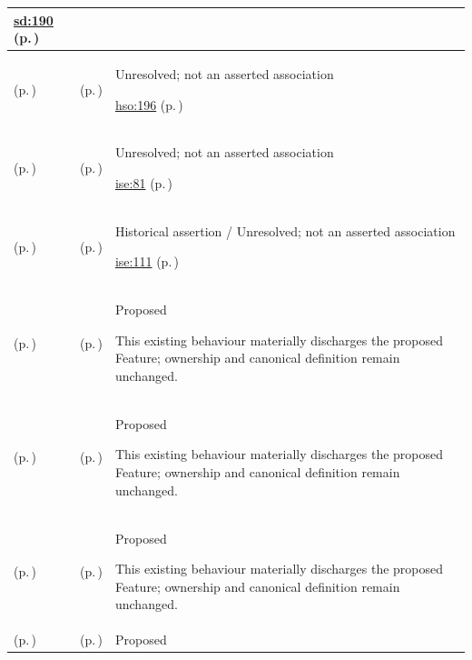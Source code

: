 \begin{longtable}{|>{\raggedright\arraybackslash}p{0.27\TableWidth}|>{\raggedright\arraybackslash}p{0.27\TableWidth}|>{\raggedright\arraybackslash}p{0.46\TableWidth}|}
 \hyperref[rad:sd:183]{sd:190} (p.\,\pageref{rad:sd:183})\\\hline
\nameref{function:track-operational-staff-presence} (p.\,\pageref{function:track-operational-staff-presence}) & \nameref{feature:feat-hso-16} (p.\,\pageref{feature:feat-hso-16}) & Unresolved; not an asserted association

 \hyperref[rad:hso:190]{hso:196} (p.\,\pageref{rad:hso:190})\\\hline
\nameref{function:retrieve-health-information} (p.\,\pageref{function:retrieve-health-information}) & \nameref{feature:feat-ise-09} (p.\,\pageref{feature:feat-ise-09}) & Unresolved; not an asserted association

 \hyperref[rad:ise:73]{ise:81} (p.\,\pageref{rad:ise:73})\\\hline
\nameref{function:evaluate-consent-constraint} (p.\,\pageref{function:evaluate-consent-constraint}) & \nameref{feature:feat-ise-12} (p.\,\pageref{feature:feat-ise-12}) & Historical assertion / Unresolved; not an asserted association

 \hyperref[rad:ise:104]{ise:111} (p.\,\pageref{rad:ise:104})\\\hline
\nameref{function:associate-order-outcome} (p.\,\pageref{function:associate-order-outcome}) & \nameref{feature:order-outcome-association} (p.\,\pageref{feature:order-outcome-association}) & Proposed

This existing behaviour materially discharges the proposed Feature; ownership and canonical definition remain unchanged.\\\hline
\nameref{function:govern-information-definition} (p.\,\pageref{function:govern-information-definition}) & \nameref{feature:information-definition-schema-governance} (p.\,\pageref{feature:information-definition-schema-governance}) & Proposed

This existing behaviour materially discharges the proposed Feature; ownership and canonical definition remain unchanged.\\\hline
\nameref{function:govern-terminology-binding} (p.\,\pageref{function:govern-terminology-binding}) & \nameref{feature:terminology-binding-governance} (p.\,\pageref{feature:terminology-binding-governance}) & Proposed

This existing behaviour materially discharges the proposed Feature; ownership and canonical definition remain unchanged.\\\hline
\nameref{function:govern-exchange-profile} (p.\,\pageref{function:govern-exchange-profile}) & \nameref{feature:exchange-profile-governance} (p.\,\pageref{feature:exchange-profile-governance}) & Proposed


\end{longtable}
